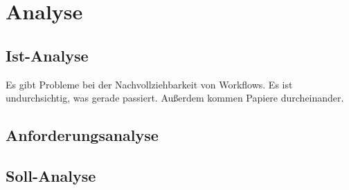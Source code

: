 \chapter{Analyse} \label{chap:analyse}

\section{Ist-Analyse} \label{sec:ist-analyse}

Es gibt Probleme bei der Nachvollziehbarkeit von Workflows. Es ist undurchsichtig, was gerade
passiert. Außerdem kommen Papiere durcheinander.

\section{Anforderungsanalyse} \label{sec:anforderungsanalyse}

\section{Soll-Analyse} \label{sec:soll-analyse}
